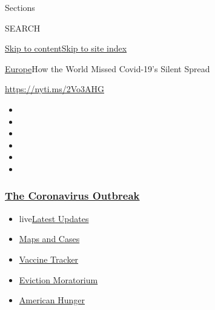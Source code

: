 Sections

SEARCH

\protect\hyperlink{site-content}{Skip to
content}\protect\hyperlink{site-index}{Skip to site index}

\href{/section/world/europe}{Europe}\textbar{}How the World Missed
Covid-19's Silent Spread

\url{https://nyti.ms/2Vo3AHG}

\begin{itemize}
\item
\item
\item
\item
\item
\item
\end{itemize}

\hypertarget{the-coronavirus-outbreak}{%
\subsubsection{\texorpdfstring{\href{https://www.nytimes3xbfgragh.onion/news-event/coronavirus?name=styln-coronavirus\&region=TOP_BANNER\&block=storyline_menu_recirc\&action=click\&pgtype=Article\&impression_id=b0487d90-f1ca-11ea-bca2-6b52b31b60eb\&variant=undefined}{The
Coronavirus
Outbreak}}{The Coronavirus Outbreak}}\label{the-coronavirus-outbreak}}

\begin{itemize}
\tightlist
\item
  live\href{https://www.nytimes3xbfgragh.onion/2020/09/08/world/covid-19-coronavirus.html?name=styln-coronavirus\&region=TOP_BANNER\&block=storyline_menu_recirc\&action=click\&pgtype=Article\&impression_id=b048a4a0-f1ca-11ea-bca2-6b52b31b60eb\&variant=undefined}{Latest
  Updates}
\item
  \href{https://www.nytimes3xbfgragh.onion/interactive/2020/us/coronavirus-us-cases.html?name=styln-coronavirus\&region=TOP_BANNER\&block=storyline_menu_recirc\&action=click\&pgtype=Article\&impression_id=b048a4a1-f1ca-11ea-bca2-6b52b31b60eb\&variant=undefined}{Maps
  and Cases}
\item
  \href{https://www.nytimes3xbfgragh.onion/interactive/2020/science/coronavirus-vaccine-tracker.html?name=styln-coronavirus\&region=TOP_BANNER\&block=storyline_menu_recirc\&action=click\&pgtype=Article\&impression_id=b048a4a2-f1ca-11ea-bca2-6b52b31b60eb\&variant=undefined}{Vaccine
  Tracker}
\item
  \href{https://www.nytimes3xbfgragh.onion/2020/09/02/your-money/eviction-moratorium-covid.html?name=styln-coronavirus\&region=TOP_BANNER\&block=storyline_menu_recirc\&action=click\&pgtype=Article\&impression_id=b048a4a3-f1ca-11ea-bca2-6b52b31b60eb\&variant=undefined}{Eviction
  Moratorium}
\item
  \href{https://www.nytimes3xbfgragh.onion/interactive/2020/09/02/magazine/food-insecurity-hunger-us.html?name=styln-coronavirus\&region=TOP_BANNER\&block=storyline_menu_recirc\&action=click\&pgtype=Article\&impression_id=b048a4a4-f1ca-11ea-bca2-6b52b31b60eb\&variant=undefined}{American
  Hunger}
\end{itemize}

